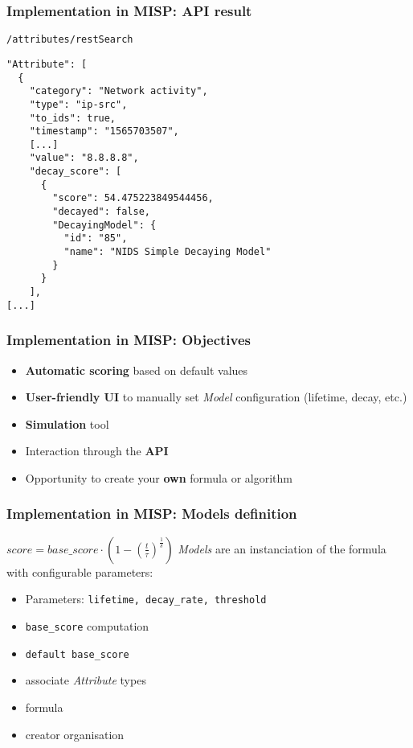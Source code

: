 \begin{frame}[fragile]
    \frametitle{Implementation in MISP: API result}
    \texttt{/attributes/restSearch}
    \begin{lstlisting}
"Attribute": [
  {
    "category": "Network activity",
    "type": "ip-src",
    "to_ids": true,
    "timestamp": "1565703507",
    [...]
    "value": "8.8.8.8",
    "decay_score": [
      {
        "score": 54.475223849544456,
        "decayed": false,
        "DecayingModel": {
          "id": "85",
          "name": "NIDS Simple Decaying Model"
        }
      }
    ],
[...]
    \end{lstlisting}
\end{frame}

\begin{frame}
\frametitle{Implementation in MISP: Objectives}
    \begin{itemize}
        \item \textbf{Automatic scoring} based on default values
        \item \textbf{User-friendly UI} to manually set \textit{Model} configuration (lifetime, decay, etc.)
        \item \textbf{Simulation} tool
        \item Interaction through the \textbf{API}
        \item Opportunity to create your \textbf{own} formula or algorithm
    \end{itemize}
\end{frame}

\begin{frame}
    \frametitle{Implementation in MISP: Models definition}
        \hspace{190pt}
        \raisebox{-1.0ex}{\Large $\Rsh$} {\tiny $score = base\_score \cdot \left( 1 - \left( \frac{t}{\tau} \right)^{\frac{1}{\delta}} \right) $}
    \textit{Models} are an instanciation of the formula with configurable parameters:
    \begin{itemize}
        \item Parameters: \texttt{lifetime, decay\_rate, threshold}
        \item \texttt{base\_score} computation
        \item \texttt{default base\_score}
        \item associate \textit{Attribute} types
        \item formula
        \item creator organisation
    \end{itemize}
\end{frame}

